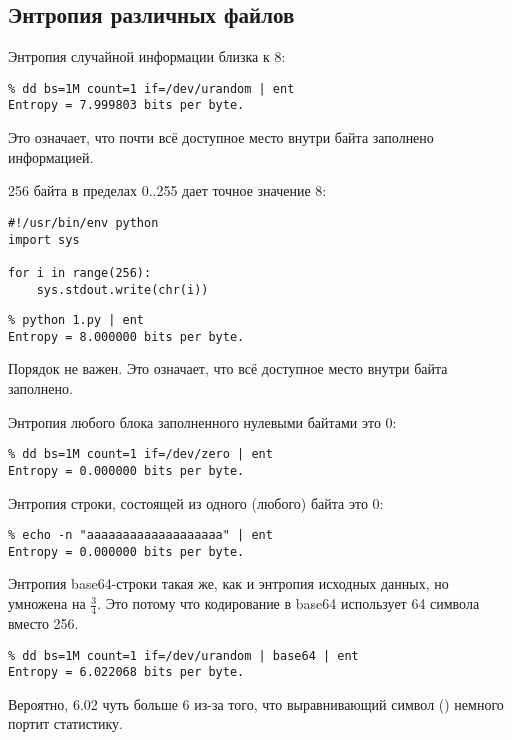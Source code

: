 \subsection{Энтропия различных файлов}

Энтропия случайной информации близка к 8:

\begin{lstlisting}
% dd bs=1M count=1 if=/dev/urandom | ent
Entropy = 7.999803 bits per byte.
\end{lstlisting}

Это означает, что почти всё доступное место внутри байта заполнено информацией.

256 байта в пределах 0..255 дает точное значение 8:

\begin{lstlisting}[style=custompy]
#!/usr/bin/env python
import sys

for i in range(256):
    sys.stdout.write(chr(i))
\end{lstlisting}

\begin{lstlisting}
% python 1.py | ent
Entropy = 8.000000 bits per byte.
\end{lstlisting}

Порядок не важен.
Это означает, что всё доступное место внутри байта заполнено.

Энтропия любого блока заполненного нулевыми байтами это 0:

\begin{lstlisting}
% dd bs=1M count=1 if=/dev/zero | ent
Entropy = 0.000000 bits per byte.
\end{lstlisting}

Энтропия строки, состоящей из одного (любого) байта это 0:

\begin{lstlisting}
% echo -n "aaaaaaaaaaaaaaaaaaa" | ent
Entropy = 0.000000 bits per byte.
\end{lstlisting}

Энтропия base64-строки такая же, как и энтропия исходных данных, но умножена на $\frac{3}{4}$.
Это потому что кодирование в base64 использует 64 символа вместо 256.

\begin{lstlisting}
% dd bs=1M count=1 if=/dev/urandom | base64 | ent
Entropy = 6.022068 bits per byte.
\end{lstlisting}

Вероятно, 6.02 чуть больше 6 из-за того, что выравнивающий символ (\TT{=}) немного портит статистику.

